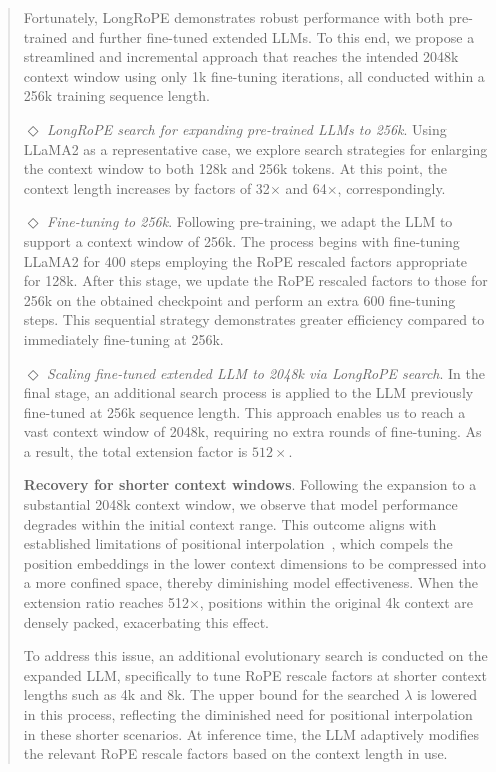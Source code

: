 \begin{abstract}
Fortunately, LongRoPE demonstrates robust performance with both pre-trained and further fine-tuned extended LLMs. To this end, we propose a streamlined and incremental approach that reaches the intended 2048k context window using only 1k fine-tuning iterations, all conducted within a 256k training sequence length.

$\Diamond$ \textit{LongRoPE search for expanding pre-trained LLMs to 256k}. Using LLaMA2 as a representative case, we explore search strategies for enlarging the context window to both 128k and 256k tokens. At this point, the context length increases by factors of 32$\times$ and 64$\times$, correspondingly.

$\Diamond$ \textit{Fine-tuning to 256k}. Following pre-training, we adapt the LLM to support a context window of 256k. The process begins with fine-tuning LLaMA2 for 400 steps employing the RoPE rescaled factors appropriate for 128k. After this stage, we update the RoPE rescaled factors to those for 256k on the obtained checkpoint and perform an extra 600 fine-tuning steps. This sequential strategy demonstrates greater efficiency compared to immediately fine-tuning at 256k.

$\Diamond$ \textit{Scaling fine-tuned extended LLM to 2048k via LongRoPE search}. In the final stage, an additional search process is applied to the LLM previously fine-tuned at 256k sequence length. This approach enables us to reach a vast context window of 2048k, requiring no extra rounds of fine-tuning. As a result, the total extension factor is $512\times$.

\textbf{Recovery for shorter context windows}. Following the expansion to a substantial 2048k context window, we observe that model performance degrades within the initial context range. This outcome aligns with established limitations of positional interpolation~\cite{pi}, which compels the position embeddings in the lower context dimensions to be compressed into a more confined space, thereby diminishing model effectiveness. When the extension ratio reaches 512$\times$, positions within the original 4k context are densely packed, exacerbating this effect.

To address this issue, an additional evolutionary search is conducted on the expanded LLM, specifically to tune RoPE rescale factors at shorter context lengths such as 4k and 8k. The upper bound for the searched $\lambda$ is lowered in this process, reflecting the diminished need for positional interpolation in these shorter scenarios. At inference time, the LLM adaptively modifies the relevant RoPE rescale factors based on the context length in use.


\end{abstract}
